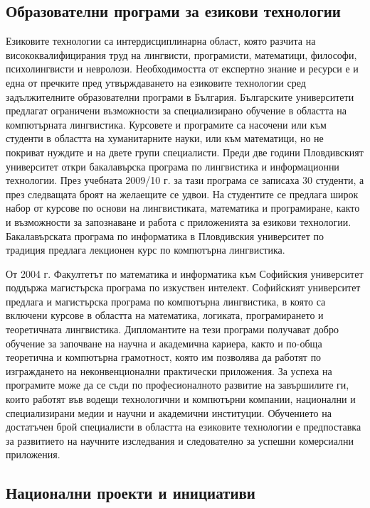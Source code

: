 \documentclass[]{../../metanetpaper}
\begin{document}
\begin{multicols}{2}
\subsection{Образователни програми за езикови технологии}

Езиковите технологии са интердисциплинарна област, която разчита на висококвалифицирания труд на лингвисти, програмисти, математици, философи, психолингвисти и невролози. Необходимостта от експертно знание и ресурси е и една от пречките пред утвърждаването на езиковите технологии сред задължителните образователни програми в България. 
Българските университети предлагат ограничени възможности за специализирано
 обучение в областта на компютърната лингвистика.
 Курсовете и програмите са насочени или
 към студенти в областта на хуманитарните науки, или
 към математици, но не покриват нуждите и на двете
 групи специалисти. Преди две години Пловдивският университет откри бакалавърска програма
 по лингвистика и информационни технологии. През
 учебната 2009/10 г. за тази програма се записаха 30
 студенти, а през следващата броят на желаещите се
 удвои. На студентите се предлага широк набор от курсове
 по
 основи
 на
 лингвистиката, математика
 и
 програмиране, както и възможности за запознаване и
 работа с приложенията за езикови технологии.
 Бакалавърската
 програма
 по
 информатика
 в
 Пловдивския университет по традиция предлага
 лекционен курс по компютърна лингвистика.

От 2004 г. Факултетът по математика и информатика към Софийския университет поддържа магистърска програма
 по
 изкуствен
 интелект.
 Софийският университет предлага и магистърска програма по компютърна лингвистика, в която са включени курсове в
 областта на математика, логиката, програмирането и
 теоретичната лингвистика. Дипломантите на тези програми получават добро
 обучение за започване на научна и академична кариера,
 както и по-обща теоретична и компютърна грамотност,
 която им позволява да работят по изграждането на
 неконвенционални практически приложения. За успеха
 на програмите може да се съди по професионалното
 развитие на завършилите ги, които работят във водещи
 технологични и компютърни компании, национални и
 специализирани медии и научни и академични
 институции.
Обучението на достатъчен брой специалисти в областта на езиковите технологии е предпоставка за развитието на научните изследвания и следователно за успешни комерсиални приложения. 

\subsection{Национални проекти и инициативи}


\end{multicols}
\end{document}
